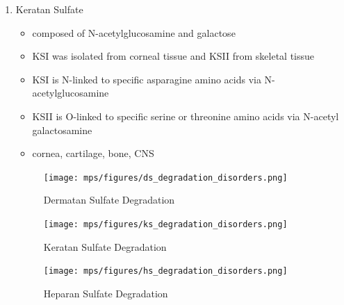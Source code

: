 \documentclass[12pt]{scrartcl}
\begin{document}
\begin{enumerate}
\item Keratan Sulfate
\label{sec:orgc50adcb}
\begin{itemize}
\item composed of N-acetylglucosamine and galactose
\item KSI was isolated from corneal tissue and KSII from skeletal tissue
\item KSI is N-linked to specific asparagine amino acids via
N-acetylglucosamine
\item KSII is O-linked to specific serine or threonine amino acids via
N-acetyl galactosamine
\item cornea, cartilage, bone, CNS
\end{itemize}

\begin{figure}[htbp]
\centering
\texttt{[image: mps/figures/ds\_degradation\_disorders.png]}
\caption[DS Degradation]{\label{fig:orge59feea}Dermatan Sulfate Degradation}
\end{figure}

\begin{figure}[htbp]
\centering
\texttt{[image: mps/figures/ks\_degradation\_disorders.png]}
\caption[KS Degradation]{\label{fig:org43b5f88}Keratan Sulfate Degradation}
\end{figure}

\begin{figure}[htbp]
\centering
\texttt{[image: mps/figures/hs\_degradation\_disorders.png]}
\caption[HS Degradation]{\label{fig:orgf779af6}Heparan Sulfate Degradation}
\end{figure}
\end{enumerate}
\end{document}
